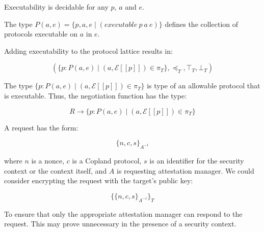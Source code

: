 \documentclass[sigconf,authordraft]{acmart}
\newcommand{\sign}[2]{\ensuremath{\{#1\}_{#2^{-1}}}}
\begin{document}
Executability is decidable for any $p$, $a$ and $e$.

The type $P(a,e)=\{p,a,e\mid (executable\ p\ a\ e)\}$ defines the collection of
protocols executable on $a$ in $e$.

Adding executability to the protocol lattice results in:

\[(\{p:P(a,e)\mid
  (a,\mathcal{E}[\![p]\!])\in\pi_T \},\preceq_T,\top_T,\bot_T)\]

The type $\{p:P(a,e)\mid (a,\mathcal{E}[\![p]\!])\in\pi_T\}$ is type of an allowable protocol that is
executable.  Thus, the negotiation function has the type:

\[R\rightarrow \{p:P(a,e)\mid (a,\mathcal{E}[\![p]\!])\in\pi_T\}\]

A request has the form:

\[\sign{n,c,s}{A}\]

where $n$ is a nonce, $c$ is a Copland protocol, $s$ is an identifier
for the security context or the context itself, and $A$ is requesting
attestation manager.  We could consider encrypting the request with
the target's public key:

\[\{\sign{n,c,s}{A}\}_T\]

To ensure that only the appropriate attestation manager can respond to
the request.  This may prove unnecessary in the presence of a security context.


\nocite{Coker::Principles-of-R,Ramsdell:2019aa,Petz:2019aa,Davey:02:Introduction-to}

 
\end{document}
